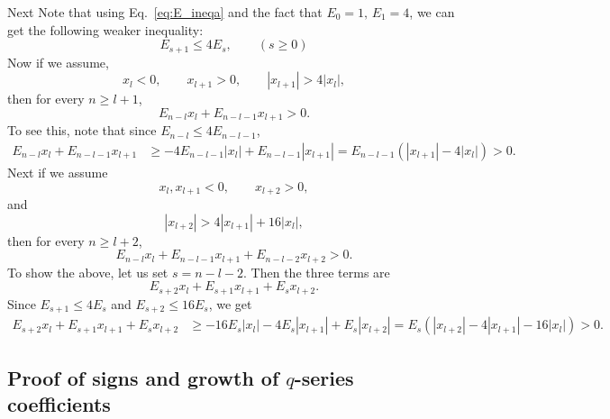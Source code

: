 \documentclass[11pt]{article}
\newcommand\be{\begin{equation}}
\newcommand\ee{\end{equation}}
\begin{document}
Next Note that using Eq.~\eqref{eq:E_ineqa} and the fact that $E_0 = 1, \, E_1=4$, we can get the following weaker inequality:
\be
    E_{s+1}\leq 4 E_s, \qquad (s\geq 0)
\ee
Now if we assume,
\be\label{eq:xjE1}
        x_l<0,\qquad x_{l+1}>0,\qquad |x_{l+1}|>4|x_l|,
\ee
then for every \(n\ge l+1\),
\be\label{eq:xjE2a}
        E_{n-l}x_l+E_{n-l-1}x_{l+1}>0.
\ee
To see this, note that since \(E_{n-l}\le 4E_{n-l-1}\),
\[
\begin{aligned}
E_{n-l}x_l + E_{n-l-1}x_{l+1}
&\ge
-4E_{n-l-1}|x_l| + E_{n-l-1}|x_{l+1}|=
E_{n-l-1}\left(|x_{l+1}|-4|x_l|\right)>0.
\end{aligned}
\]
Next if we assume
\be\label{eq:xjE3}
        x_l,x_{l+1}<0,\qquad x_{l+2}>0,
\ee
and
\be\label{eq:xjE4}
        |x_{l+2}|>4|x_{l+1}|+16|x_l|,
\ee
then for every \(n\ge l+2\),
\be\label{eq:xjE5}
        E_{n-l}x_l + E_{n-l-1}x_{l+1} + E_{n-l-2}x_{l+2}>0.
\ee
To show the above, let us set \(s=n-l-2\). Then the three terms are
\be
        E_{s+2}x_l + E_{s+1}x_{l+1} + E_sx_{l+2}.
\ee
Since \(E_{s+1}\le 4E_s\) and \(E_{s+2}\le 16E_s\), we get
\be
\begin{aligned}
E_{s+2}x_l + E_{s+1}x_{l+1} + E_sx_{l+2}
&\ge
-16E_s|x_l| - 4E_s|x_{l+1}| + E_s|x_{l+2}|=
E_s\left(|x_{l+2}|-4|x_{l+1}|-16|x_l|\right)>0.
\end{aligned}
\ee

\subsection{Proof of signs and growth of $q$-series coefficients}\label{app:sgn_an_dn}
\end{document}
